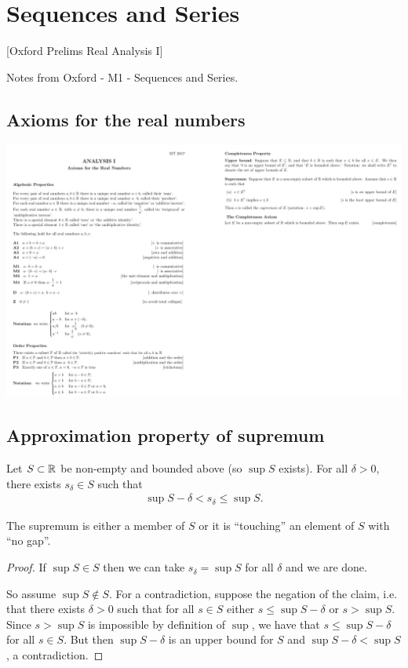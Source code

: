 \let\B\undefined
\newcommand{\B}{\mathcal B}
\let\T\undefined
\newcommand{\T}{\mathcal T}

\section{Sequences and Series}
[Oxford Prelims Real Analysis I]

Notes from Oxford - M1 - Sequences and Series.

\subsection{Axioms for the real numbers}
\begin{mdframed}
\includegraphics[width=400pt]{img/oxford-prelims-M2-analysis-I-axioms-for-real-numbers.png}
\end{mdframed}

\subsection{Approximation property of supremum}
\begin{theorem*}
  Let $S \subset \mathbb{R}$ be non-empty and bounded above (so $\sup S$ exists). For all $\delta > 0$,
  there exists $s_\delta \in S$ such that
  \begin{align*}
    \sup S - \delta < s_\delta \leq \sup S.
  \end{align*}
  \begin{intuition*}
    The supremum is either a member of $S$ or it is ``touching'' an element of $S$ with ``no gap''.
  \end{intuition*}
  \begin{proof}
    If $\sup S \in S$ then we can take $s_\delta = \sup S$ for all $\delta$ and we are done.

    So assume $\sup S \not\in S$. For a contradiction, suppose the negation of the claim, i.e. that
    there exists $\delta > 0$ such that for all $s \in S$ either $s \leq \sup S - \delta$ or
    $s > \sup S$. Since $s > \sup S$ is impossible by definition of $\sup$, we have that
    $s \leq \sup S - \delta$ for all $s \in S$. But then $\sup S - \delta$ is an upper bound for
    $S$ and $\sup S - \delta < \sup S$, a contradiction.
  \end{proof}
\end{theorem*}

